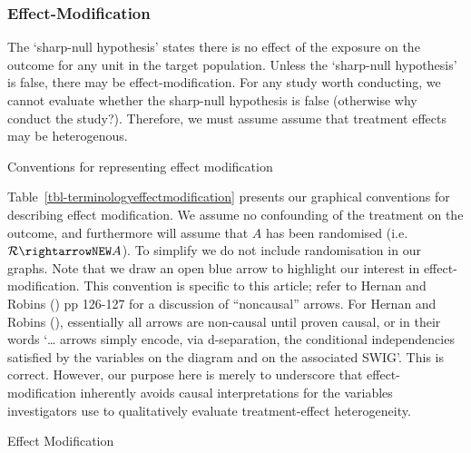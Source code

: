 \documentclass[
  single column]{article}
\begin{document}
\subsubsection{Effect-Modification}\label{effect-modification}

The `sharp-null hypothesis' states there is no effect of the exposure on
the outcome for any unit in the target population. Unless the
`sharp-null hypothesis' is false, there may be effect-modification. For
any study worth conducting, we cannot evaluate whether the sharp-null
hypothesis is false (otherwise why conduct the study?). Therefore, we
must assume assume that treatment effects may be heterogenous.

\begin{table}

\caption{\label{tbl-terminologyeffectmodification}Conventions for
representing effect modification}

\centering{

\terminologyeffectmodification

}

\end{table}%

Table~\ref{tbl-terminologyeffectmodification} presents our graphical
conventions for describing effect modification. We assume no confounding
of the treatment on the outcome, and furthermore will assume that \(A\)
has been randomised (i.e.~\(\mathcal{R} \rightarrowNEW A\)). To simplify
we do not include randomisation in our graphs. Note that we draw an open
blue arrow to highlight our interest in effect-modification. This
convention is specific to this article; refer to Hernan and Robins
() pp 126-127 for a discussion of
``noncausal'' arrows. For Hernan and Robins
(), essentially all arrows are
non-causal until proven causal, or in their words `\ldots{} arrows
simply encode, via d-separation, the conditional independencies
satisfied by the variables on the diagram and on the associated SWIG'.
This is correct. However, our purpose here is merely to underscore that
effect-modification inherently avoids causal interpretations for the
variables investigators use to qualitatively evaluate treatment-effect
heterogeneity.

\begin{table}

\caption{\label{tbl-terminologyeffectmodificationtypes}Effect
Modification}

\centering{

\terminologyeffectmodificationtypes

}

\end{table}%
\end{document}
